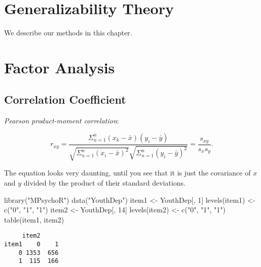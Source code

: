 \documentclass[
]{book}
\newenvironment{Shaded}{\begin{snugshade}}{\end{snugshade}}
\newcommand{\DecValTok}[1]{\textcolor[rgb]{0.00,0.00,0.81}{#1}}
\newcommand{\FunctionTok}[1]{\textcolor[rgb]{0.00,0.00,0.00}{#1}}
\newcommand{\NormalTok}[1]{#1}
\newcommand{\OtherTok}[1]{\textcolor[rgb]{0.56,0.35,0.01}{#1}}
\newcommand{\StringTok}[1]{\textcolor[rgb]{0.31,0.60,0.02}{#1}}
\begin{document}
\hypertarget{generalizability-theory-1}{%
\chapter{Generalizability Theory}\label{generalizability-theory-1}}

We describe our methods in this chapter.

\hypertarget{factor-analysis}{%
\chapter{Factor Analysis}\label{factor-analysis}}

\hypertarget{correlation-coefficient}{%
\section{Correlation Coefficient}\label{correlation-coefficient}}

\emph{Pearson product-moment correlation}:

\[
r_{xy} = \frac{\Sigma_{n=1}^n (x_k - \bar{x})(y_i - \bar{y})}{\sqrt{\Sigma_{n=1}^n(x_i - \bar{x})^2} \sqrt{\Sigma_{n=1}^n(y_i - \bar{y})^2}} = \frac{s_{xy}}{s_x s_y}.
\]

The equation looks very daunting, until you see that it is just the covariance of \(x\) and \(y\) divided by the product of their standard deviations.

\begin{Shaded}
\begin{Highlighting}[]
\FunctionTok{library}\NormalTok{(}\StringTok{"MPsychoR"}\NormalTok{)}
\FunctionTok{data}\NormalTok{(}\StringTok{"YouthDep"}\NormalTok{)}
\NormalTok{item1 }\OtherTok{\textless{}{-}}\NormalTok{ YouthDep[, }\DecValTok{1}\NormalTok{]}
\FunctionTok{levels}\NormalTok{(item1) }\OtherTok{\textless{}{-}} \FunctionTok{c}\NormalTok{(}\StringTok{"0"}\NormalTok{, }\StringTok{"1"}\NormalTok{, }\StringTok{"1"}\NormalTok{)}
\NormalTok{item2 }\OtherTok{\textless{}{-}}\NormalTok{ YouthDep[, }\DecValTok{14}\NormalTok{]}
\FunctionTok{levels}\NormalTok{(item2) }\OtherTok{\textless{}{-}} \FunctionTok{c}\NormalTok{(}\StringTok{"0"}\NormalTok{, }\StringTok{"1"}\NormalTok{, }\StringTok{"1"}\NormalTok{)}
\FunctionTok{table}\NormalTok{(item1, item2)}
\end{Highlighting}
\end{Shaded}

\begin{verbatim}
     item2
item1    0    1
    0 1353  656
    1  115  166
\end{verbatim}
\end{document}
